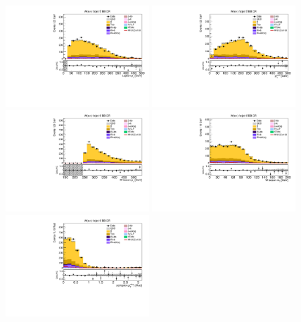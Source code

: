\begin{figure}[tbp]
  \begin{center}
    \includegraphics[width=0.48\textwidth]{figures/wlnhbb2016/boosted/WenWHTT2bFJCR_lepton1Pt.pdf}
    \includegraphics[width=0.48\textwidth]{figures/wlnhbb2016/boosted/WenWHTT2bFJCR_pfmet.pdf}
    \includegraphics[width=0.48\textwidth]{figures/wlnhbb2016/boosted/WenWHTT2bFJCR_topWBosonPt.pdf}
    \includegraphics[width=0.48\textwidth]{figures/wlnhbb2016/boosted/WenWHTT2bFJCR_mT.pdf}
    \includegraphics[width=0.48\textwidth]{figures/wlnhbb2016/boosted/WenWHTT2bFJCR_deltaPhiLep1Met.pdf}

\end{center}
\end{figure}
